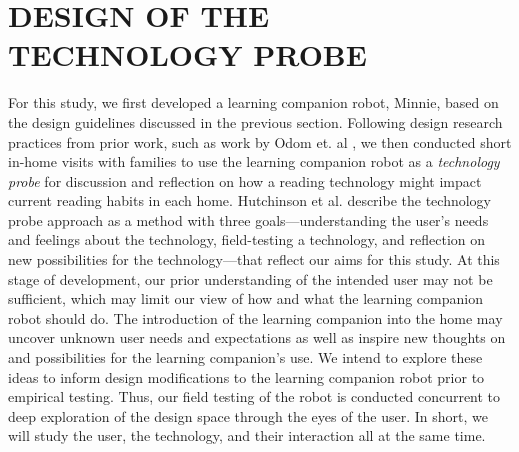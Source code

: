 \documentclass{sigchi}
\begin{document}



\section{DESIGN OF THE TECHNOLOGY PROBE}
 For this study, we first developed a learning companion robot, Minnie, based on the design guidelines discussed in the previous section. Following design research practices from prior work, such as work by Odom et. al \cite{Odom:2012}, we then conducted short in-home visits with families to use the learning companion robot as a \textit{technology probe} \cite{Hutchinson:2003} for discussion and reflection on how a reading technology might impact current reading habits in each home. Hutchinson et al. \cite{Hutchinson:2003} describe the technology probe approach as a method with three goals---understanding the user's needs and feelings about the technology, field-testing a technology, and reflection on new possibilities for the technology---that reflect our aims for this study. At this stage of development, our prior understanding of the intended user may not be sufficient, which may limit our view of how and what the learning companion robot should do. The introduction of the learning companion into the home may uncover unknown user needs and expectations as well as inspire new thoughts on and possibilities for the learning companion's use. We intend to explore these ideas to inform design modifications to the learning companion robot prior to empirical testing. Thus, our field testing of the robot is conducted concurrent to deep exploration of the design space through the eyes of the user. In short, we will study the user, the technology, and their interaction all at the same time.
\end{document}

